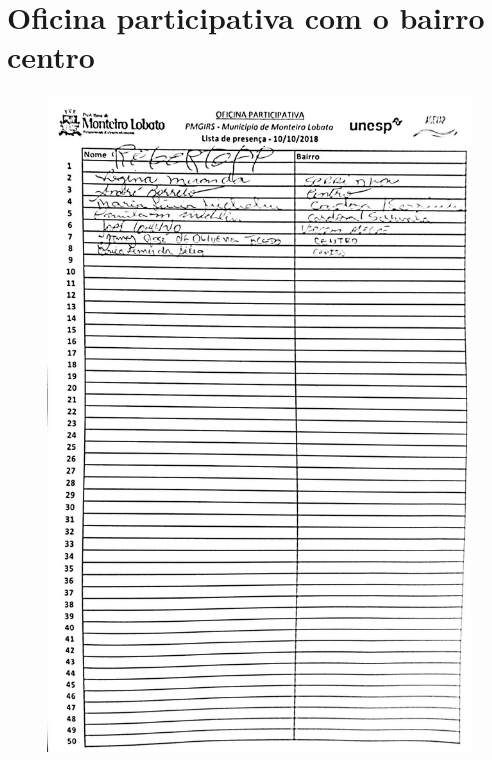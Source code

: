 \section{Oficina participativa com o bairro centro}
\begin{figure}[h]
	\centering
	\includegraphics[width=.75\linewidth]{produtos/prodtres/image124}
	\caption*{}
	\label{fig:image124}
\end{figure}

\FloatBarrier
\newpage
